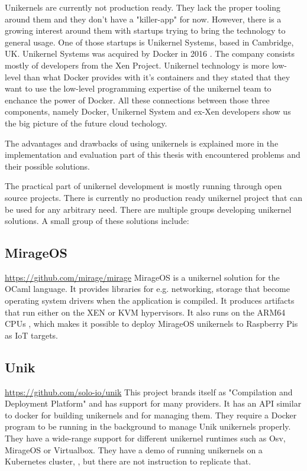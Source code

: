 Unikernels are currently not production ready. \cite{unfit-for-production} They lack the proper tooling around them and they don't have a "killer-app" for now. However, there is a growing interest around them with startups trying to bring the technology to general usage. One of those startups is Unikernel Systems, based in Cambridge, UK. Unikernel Systems was acquired by Docker in 2016 \cite{docker-acquisiton}. The company consists mostly of developers from the Xen Project. Unikernel technology is more low-level than what Docker provides with it's containers and they stated that they want to use the low-level programming expertise of the unikernel team to enchance the power of Docker. All these connections between those three components, namely Docker, Unikernel System and ex-Xen developers show us the big picture of the future cloud techology.

The advantages and drawbacks of using unikernels is explained more in the implementation and evaluation part of this thesis with encountered problems and their possible solutions.

The practical part of unikernel development is mostly running through open source projects. There is currently no production ready unikernel project that can be used for any arbitrary need. There are multiple groups developing unikernel solutions. A small group of these solutions include:
\subsection*{MirageOS}

\url{https://github.com/mirage/mirage} \cite{madhavapeddy2014unikernels}
  MirageOS is a unikernel solution for the OCaml language. It provides libraries for e.g. networking, storage that become operating system drivers when the application is compiled. It produces artifacts that run either on the XEN or KVM hypervisors. It also runs on the ARM64 CPUs , which makes it possible to deploy MirageOS unikernels to Raspberry Pis as IoT targets.
\subsection*{Unik}
\url{https://github.com/solo-io/unik}\cite{levine2016unik} This project brands itself as "Compilation and Deployment Platform" and has support for many providers. It has an API similar to docker for building unikernels and for managing them. They require a Docker program to be running in the background to manage Unik unikernels properly. They have a wide-range support for different unikernel runtimes such as Osv, MirageOS or Virtualbox. They have a demo of running unikernels on a Kubernetes cluster, \cite{unik-youtube}, but there are not instruction to replicate that.

